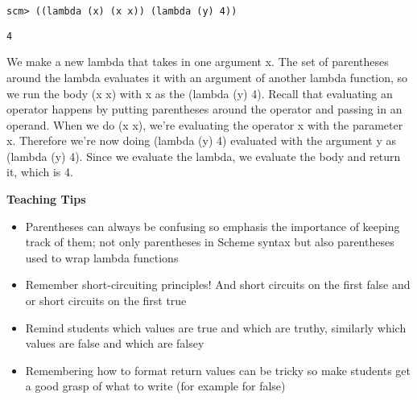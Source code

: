 \begin{blocksection}
\begin{lstlisting}
scm> ((lambda (x) (x x)) (lambda (y) 4))
\end{lstlisting}
\begin{solution}[0.25in]
\begin{lstlisting}
4
\end{lstlisting}
We make a new lambda that takes in one argument x. The set of parentheses around the lambda evaluates it with an argument of another lambda function, so we run the body (x x) with x as the (lambda (y) 4). Recall that evaluating an operator happens by putting parentheses around the operator and passing in an operand. When we do (x x), we’re evaluating the operator x with the parameter x. Therefore we’re now doing (lambda (y) 4) evaluated with the argument y as (lambda (y) 4). Since we evaluate the lambda, we evaluate the body and return it, which is 4. 
\end{solution}
\end{blocksection}

\begin{blocksection}
\begin{guide}
\textbf{Teaching Tips}
\begin{itemize}
	\item Parentheses can always be confusing so emphasis the importance of keeping track of them; not only parentheses in Scheme syntax but also parentheses used to wrap lambda functions
	\item Remember short-circuiting principles! And short circuits on the first false and or short circuits on the first true
	\item Remind students which values are true and which are truthy, similarly which values are false and which are falsey
	\item Remembering how to format return values can be tricky so make students get a good grasp of what to write (for example for false)
\end{itemize}
\end{guide}
\end{blocksection}
